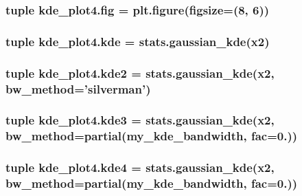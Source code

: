 \subsubsection[{fig}]{\setlength{\rightskip}{0pt plus 5cm}tuple kde\+\_\+plot4.\+fig = plt.\+figure(figsize=(8, 6))}\label{namespacekde__plot4_a3f175e7060761b2d6fc3cc1df78b3e95}
\hypertarget{namespacekde__plot4_ab68409392bf7a42c940367c17a97a3a2}{}
\subsubsection[{kde}]{\setlength{\rightskip}{0pt plus 5cm}tuple kde\+\_\+plot4.\+kde = stats.\+gaussian\+\_\+kde({\bf x2})}\label{namespacekde__plot4_ab68409392bf7a42c940367c17a97a3a2}
\hypertarget{namespacekde__plot4_a13f4c30d2bd26c7baabd8a9d2df00eda}{}
\subsubsection[{kde2}]{\setlength{\rightskip}{0pt plus 5cm}tuple kde\+\_\+plot4.\+kde2 = stats.\+gaussian\+\_\+kde({\bf x2}, bw\+\_\+method='silverman')}\label{namespacekde__plot4_a13f4c30d2bd26c7baabd8a9d2df00eda}
\hypertarget{namespacekde__plot4_a4da0f8c149097a740bafcf2919314a5a}{}
\subsubsection[{kde3}]{\setlength{\rightskip}{0pt plus 5cm}tuple kde\+\_\+plot4.\+kde3 = stats.\+gaussian\+\_\+kde({\bf x2}, bw\+\_\+method=partial({\bf my\+\_\+kde\+\_\+bandwidth}, {\bf fac}=0.))}\label{namespacekde__plot4_a4da0f8c149097a740bafcf2919314a5a}
\hypertarget{namespacekde__plot4_aa099442190379cc2a276bf2f0775cabf}{}
\subsubsection[{kde4}]{\setlength{\rightskip}{0pt plus 5cm}tuple kde\+\_\+plot4.\+kde4 = stats.\+gaussian\+\_\+kde({\bf x2}, bw\+\_\+method=partial({\bf my\+\_\+kde\+\_\+bandwidth}, {\bf fac}=0.))}\label{namespacekde__plot4_aa099442190379cc2a276bf2f0775cabf}
\hypertarget{namespacekde__plot4_a3fcf50e40bf645f4cdd0418766bc77ae}{}

